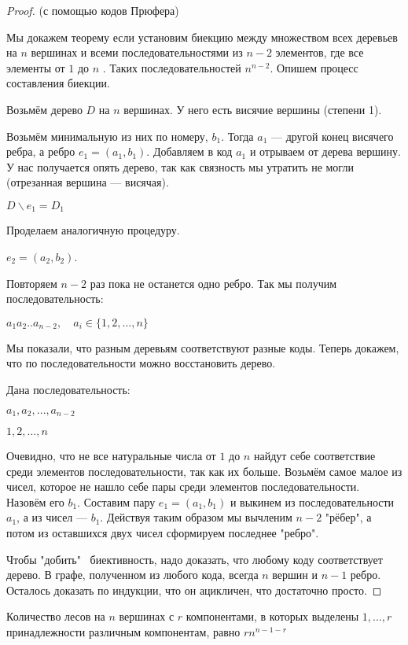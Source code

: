 \begin{proof} (с помощью кодов Прюфера)

Мы докажем теорему если установим биекцию между множеством всех деревьев на $n$ вершинах и всеми последовательностями из $n-2$ элементов, где все элементы от $1$ до $n$ . Таких последовательностей $n^{n-2}$. Опишем процесс составления биекции.
 
Возьмём дерево $D$ на $n$ вершинах. У него есть висячие вершины (степени 1). 

Возьмём минимальную из них по номеру, $b_1$.  Тогда $a_1$ --- другой конец висячего ребра, а ребро $e_1 = ( a_1, b_1 )$. 
Добавляем в код $a_1$  и отрываем от дерева вершину. У нас получается опять дерево, так как связность мы утратить не могли (отрезанная вершина --- висячая). 

$D \backslash e_1 = D_1$

Проделаем аналогичную процедуру. 

$e_2 = ( a_2, b_2 )$. 


Повторяем $n-2$ раз пока не останется одно ребро. Так мы получим последовательность:


 
$a_1 a_2 .. a_{n-2}, \quad a_i \in \{1,2, \dots , n\}$

Мы показали, что разным деревьям соответствуют разные коды. Теперь докажем, что по последовательности можно восстановить дерево.

Дана последовательность:

$ a_1, a_2, \dots , a_{n-2} $

$ 1,2,\dots, n$

Очевидно, что не все натуральные числа от $1$ до $n$ найдут себе соответствие среди элементов последовательности, так как их больше. Возьмём самое малое из чисел, которое не нашло себе пары среди элементов последовательности. Назовём его $b_1$. Составим пару $e_1 = (a_1, b_1)$ и выкинем из последовательности $a_1$, а из чисел --- $b_1$. 
Действуя таким образом мы вычленим $n-2$ "рёбер", а потом из оставшихся двух чисел сформируем последнее "ребро". 



Чтобы "добить" \ биективность, надо доказать, что любому коду соответствует дерево. 
В графе, полученном из любого кода, всегда $n$ вершин и $n-1$ ребро. Осталось доказать по индукции, что он ацикличен, что достаточно просто. 

\end{proof} 

\begin{thm}
Количество лесов на $n$ вершинах с $r$ компонентами, в которых выделены $1, \dots, r$ принадлежности различным компонентам, равно $r n^{n-1-r}$ 
\end{thm}
  

